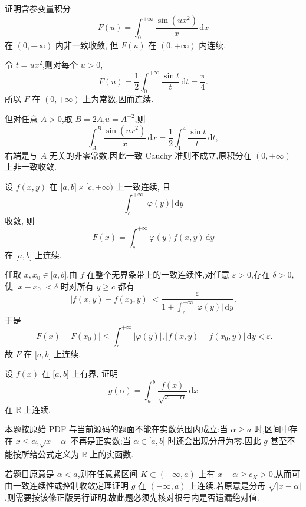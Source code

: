 \begin{example}
    证明含参变量积分
    \[
        F(u)=\int_0^{+\infty}\dfrac{\sin(ux^2)}{x}\,\mathrm{d}x
    \]
    在 $(0,+\infty)$ 内非一致收敛, 但 $F(u)$ 在 $(0,+\infty)$ 内连续.
\end{example}
\exampleblank

\begin{solution}
    令 $t=ux^2$,则对每个 $u>0$,
    \[
        F(u)=\dfrac{1}{2}\int_0^{+\infty}\dfrac{\sin t}{t}\,\mathrm{d}t
        =\dfrac{\pi}{4}.
    \]
    所以 $F$ 在 $(0,+\infty)$ 上为常数,因而连续.

    但对任意 $A>0$,取 $B=2A$,$u=A^{-2}$,则
    \[
        \displaystyle\int_A^B\dfrac{\sin(ux^2)}{x}\,\mathrm{d}x
        =\dfrac{1}{2}\int_1^4\dfrac{\sin t}{t}\,\mathrm{d}t,
    \]
    右端是与 $A$ 无关的非零常数.因此一致 Cauchy 准则不成立,原积分在 $(0,+\infty)$ 上非一致收敛.
\end{solution}

\begin{example}
    设 $f(x,y)$ 在 $\lbrack a,b\rbrack\times\lbrack c,+\infty)$ 上一致连续, 且
    \[
        \displaystyle\int_c^{+\infty}|\varphi(y)|\,\mathrm{d}y
    \]
    收敛, 则
    \[
        F(x)=\int_c^{+\infty}\varphi(y)f(x,y)\,\mathrm{d}y
    \]
    在 $\lbrack a,b\rbrack$ 上连续.
\end{example}
\exampleblank

\begin{solution}
    任取 $x,x_0\in\lbrack a,b\rbrack$.由 $f$ 在整个无界条带上的一致连续性,对任意 $\varepsilon>0$,存在 $\delta>0$,使 $|x-x_0|<\delta$ 时对所有 $y\geq c$ 都有
    \[
        |f(x,y)-f(x_0,y)|<\dfrac{\varepsilon}{\displaystyle 1+\int_c^{+\infty}|\varphi(y)|\,\mathrm{d}y}.
    \]
    于是
    \[
        |F(x)-F(x_0)|
        \leq\int_c^{+\infty}|\varphi(y)|,|f(x,y)-f(x_0,y)|\,\mathrm{d}y<\varepsilon.
    \]
    故 $F$ 在 $\lbrack a,b\rbrack$ 上连续.
\end{solution}

\begin{example}[\markstar]
    设 $f(x)$ 在 $\lbrack a,b\rbrack$ 上有界, 证明
    \[
        g(\alpha)=\int_a^b\dfrac{f(x)}{\sqrt{x-\alpha}}\,\mathrm{d}x
    \]
    在 $\mathbb{R}$ 上连续.
\end{example}
\exampleblank

\begin{solution}
    本题按原始 PDF 与当前源码的题面不能在实数范围内成立:当 $\alpha\geq a$ 时,区间中存在 $x\leq\alpha$,$\sqrt{x-\alpha}$ 不再是正实数;当 $\alpha\in\lbrack a,b\rbrack$ 时还会出现分母为零.因此 $g$ 甚至不能按所给公式定义为 $\mathbb{R}$ 上的实函数.

    若题目原意是 $\alpha<a$,则在任意紧区间 $K\subset(-\infty,a)$ 上有
    $x-\alpha\geq c_K>0$,从而可由一致连续性或控制收敛定理证明 $g$ 在 $(-\infty,a)$ 上连续.若原意是分母 $\sqrt{|x-\alpha|}$,则需要按该修正版另行证明.故此题必须先核对根号内是否遗漏绝对值.
\end{solution}

